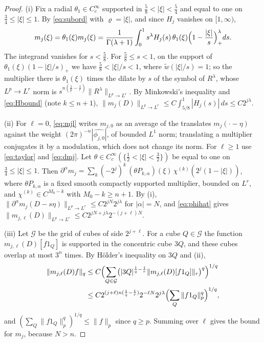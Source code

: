 \begin{proof}
(i) Fix a radial $\theta_1\in C^\infty_c$ supported in $\frac58<|\xi|<\frac54$ and equal to one on
$\frac34\le|\xi|\le1$. By \eqref{eq:subord} with $\varrho=|\xi|$, and since $H_j$ vanishes on $[1,\infty)$,
\[
m_j(\xi)=\theta_1(\xi)m_j(\xi)=\frac1{\Gamma(\lambda+1)}\int_0^1s^\lambda H_j(s)\,\theta_1(\xi)\Bigl(1-\frac{|\xi|}s\Bigr)^\lambda_+ds .
\]
The integrand vanishes for $s<\frac58$. For $\frac58\le s<1$, on the support of $\theta_1(\xi)(1-|\xi|/s)_+$
we have $\frac58<|\xi|/s<1$, where $\tilde w(|\xi|/s)=1$; so the multiplier there is $\theta_1(\xi)$ times the
dilate by $s$ of the symbol of $R^\lambda$, whose $L^p\to L^r$ norm is $s^{n(\frac1p-\frac1r)}\|R^\lambda\|_{L^p\to L^r}$.
By Minkowski's inequality and \eqref{eq:Hbound} (note $k\le n+1$),
$\|m_j(D)\|_{L^p\to L^r}\le C\int_{5/8}^1|H_j(s)|\,ds\le C2^{j\lambda}$.

(ii) For $\ell=0$, \eqref{eq:mjl} writes $m_{j,0}$ as an average of the translates $m_j(\cdot-\eta)$
against the weight $(2\pi)^{-n}|\widehat{\phi_{j,0}}|$, of bounded $L^1$ norm; translating a multiplier
conjugates it by a modulation, which does not change its norm. For $\ell\ge1$ use \eqref{eq:taylor}
and \eqref{eq:dmj}. Let $\theta\in C^\infty_c(\{\frac12<|\xi|<\frac32\})$ be equal to one on
$\frac34\le|\xi|\le1$. Then $\partial^\alpha m_j=\sum_k(-2^j)^k\,(\theta P_{k,\alpha})(\xi)\,\chi^{(k)}(2^j(1-|\xi|))$, where
$\theta P_{k,\alpha}$ is a fixed smooth compactly supported multiplier, bounded on $L^r$, and
$\chi^{(k)}\in C^{M_0-k}$ with $M_0-k\ge n+1$. By (i), $\|\partial^\alpha m_j(D-s\eta)\|_{L^p\to L^r}\le C2^{jN}2^{j\lambda}$ for
$|\alpha|=N$, and \eqref{eq:phihat} gives $\|m_{j,\ell}(D)\|_{L^p\to L^r}\le C2^{jN+j\lambda}2^{-(j+\ell)N}$.

(iii) Let $\mathcal G$ be the grid of cubes of side $2^{j+\ell}$. For a cube $Q\in\mathcal G$ the
function $m_{j,\ell}(D)[f1_Q]$ is supported in the concentric cube $3Q$, and these cubes overlap at most
$3^n$ times. By H\"older's inequality on $3Q$ and (ii),
\begin{align*}
\|m_{j,\ell}(D)f\|_q&\le C\Bigl(\sum_{Q\in\mathcal G}\bigl(|3Q|^{\frac1q-\frac1r}\|m_{j,\ell}(D)[f1_Q]\|_r\bigr)^q\Bigr)^{1/q}\\
&\le C2^{(j+\ell)n(\frac1q-\frac1r)}2^{-\ell N}2^{j\lambda}\Bigl(\sum_Q\|f1_Q\|_p^q\Bigr)^{1/q},
\end{align*}
and $(\sum_Q\|f1_Q\|_p^q)^{1/q}\le\|f\|_p$ since $q\ge p$. Summing over $\ell$ gives the bound for $m_j$,
because $N>n$.
\end{proof}

